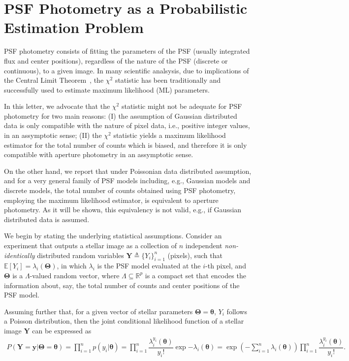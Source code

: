 \documentclass{rnaastex}
\begin{document}
\section{PSF Photometry as a Probabilistic Estimation Problem}

PSF photometry consists of fitting the parameters of the PSF
(usually integrated flux and center positions), regardless of the nature of the
PSF (discrete or continuous), to a given image. In many scientific analsysis,
due to implications of the Central Limit Theorem~\citep{grimmett:2001}, the
$\chi^2$ statistic has been traditionally and successfully used to estimate
maximum likelihood (ML) parameters.

In this letter, we advocate that
the $\chi^2$ statistic might not be adequate for PSF photometry for two main
reasons: (I) the assumption of Gaussian distributed data is only compatible with
the nature of pixel data, i.e., positive integer values, in an assymptotic
sense; (II) the $\chi^2$ statistic yields a maximum likelihood estimator for the
total number of counts which is biased, and therefore it is only compatible
with aperture photometry in an assymptotic sense.

On the other hand, we report that under Poissonian data distributed assumption, and for a very
general family of PSF models including, e.g., Gaussian models and discrete models,
the total number of counts obtained using PSF photometry, employing the maximum likelihood
estimator, is equivalent to aperture photometry. As it will be shown, this equivalency is not
valid, e.g., if Gaussian distributed data is assumed.

We begin by stating the underlying statistical assumptions.
Consider an experiment that outputs a stellar image as a collection of $n$ independent \emph{non-identically}
distributed random variables $\bm{Y} \triangleq \{Y_i\}_{i=1}^{n}$ (pixels), such that
$\mathbb{E}\left[Y_i\right] = \lambda_i(\bm{\Theta})$, in which $\lambda_i$ is the PSF model evaluated
at the $i$-th pixel, and $\bm{\Theta}$ is a $\Lambda$-valued random vector, where
$\Lambda \subseteq \mathbb{R}^p$ is a compact set that encodes the information about, say, the total number
of counts and center positions of the PSF model.

Assuming further that, for a given vector of stellar parameters $\bm{\Theta} = \bm{\theta}$,
$Y_i$ follows a Poisson distribution, then the joint conditional likelihood function of a
stellar image $\bm{Y}$ can be expressed as~\citep{grimmett:2001}
\begin{align}
    P(\bm{Y} = \bm{y} | \bm{\Theta} = \bm{\theta}) = \prod_{i=1}^{n} p(y_i | \bm{\theta}) = \prod_{i=1}^{n}\dfrac{\lambda_i^{y_i}(\bm{\theta})}{y_i!}\exp{-\lambda_i(\bm{\theta})} = \exp\left({-\sum_{i=1}^{n}\lambda_i(\bm{\theta})}\right)\prod_{i=1}^{n}\dfrac{\lambda_i^{y_i}(\bm{\theta})}{y_i!}.
\end{align}
\end{document}
